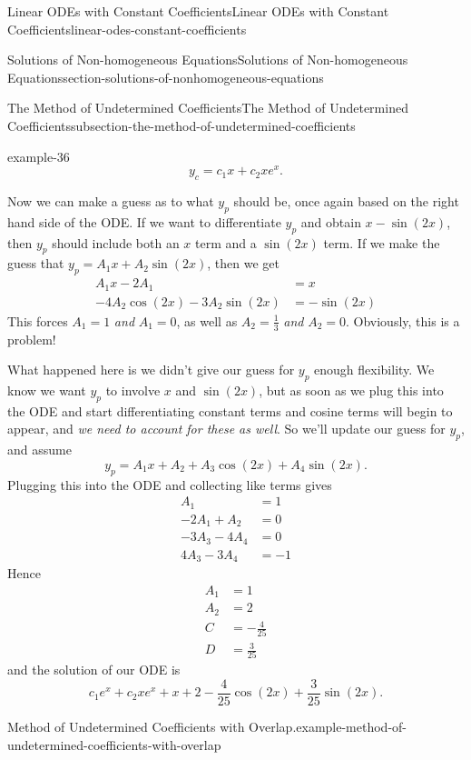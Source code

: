 \documentclass[oneside,10pt,]{book}
\numberwithin{equation}{section}
\newcommand{\amp}{&}
\begin{document}
\begin{chapterptx}{Linear ODEs with Constant Coefficients}{}{Linear ODEs with Constant Coefficients}{}{}{linear-odes-constant-coefficients}
\begin{sectionptx}{Solutions of Non-homogeneous Equations}{}{Solutions of Non-homogeneous Equations}{}{}{section-solutions-of-nonhomogeneous-equations}
\begin{subsectionptx}{The Method of Undetermined Coefficients}{}{The Method of Undetermined Coefficients}{}{}{subsection-the-method-of-undetermined-coefficients}
\begin{example}{}{example-36}
\begin{equation*}
y_{c} = c_{1}x + c_{2}xe^{x}.
\end{equation*}
%
\par
\hypertarget{p-236}{}%
Now we can make a guess as to what \(y_{p}\) should be, once again based on the right hand side of the ODE. If we want to differentiate \(y_{p}\) and obtain \(x - \sin(2x)\), then \(y_{p}\) should include both an \(x\) term and a \(\sin(2x)\) term. If we make the guess that \(y_{p} = A_{1}x + A_{2}\sin(2x)\), then we get%
\begin{align*}
A_{1}x - 2A_{1} \amp = x \\
-4A_{2}\cos(2x) - 3A_{2}\sin(2x) \amp = -\sin(2x) 
\end{align*}
This forces \(A_{1} = 1\) \emph{and} \(A_{1} = 0\), as well as \(A_{2} = \frac{1}{3}\) \emph{and} \(A_{2} = 0\). Obviously, this is a problem!%
\par
\hypertarget{p-237}{}%
What happened here is we didn't give our guess for \(y_{p}\) enough flexibility. We know we want \(y_{p}\) to involve \(x\) and \(\sin(2x)\), but as soon as we plug this into the ODE and start differentiating constant terms and cosine terms will begin to appear, and \emph{we need to account for these as well}. So we'll update our guess for \(y_{p}\), and assume%
\begin{equation*}
y_{p} = A_{1}x + A_{2} + A_{3}\cos(2x) + A_{4}\sin(2x).
\end{equation*}
Plugging this into the ODE and collecting like terms gives%
\begin{align*}
A_{1} \amp = 1\\
-2A_{1} + A_{2} \amp = 0\\
-3A_{3} - 4A_{4} \amp = 0\\
4A_{3} - 3A_{4} \amp = -1
\end{align*}
Hence%
\begin{align*}
A_{1} \amp = 1 \\
A_{2} \amp = 2 \\
C \amp = -\frac{4}{25} \\
D \amp = \frac{3}{25} 
\end{align*}
and the solution of our ODE is%
\begin{equation*}
c_{1}e^{x} + c_{2}xe^{x} + x + 2 - \frac{4}{25}\cos(2x) + \frac{3}{25}\sin(2x).
\end{equation*}
%
\end{example}
\begin{example}{Method of Undetermined Coefficients with Overlap.}{example-method-of-undetermined-coefficients-with-overlap}%

\end{example}
\end{subsectionptx}
\end{sectionptx}
\end{chapterptx}
\end{document}
